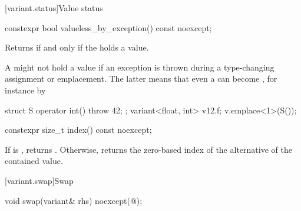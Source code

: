 [variant.status]{Value status}

%
\begin{itemdecl}
constexpr bool valueless_by_exception() const noexcept;
\end{itemdecl}

\begin{itemdescr}
\pnum
\effects
Returns  if and only if the  holds a value.

\pnum
\begin{note}
A  might not hold a value if an exception is thrown during a
type-changing assignment or emplacement. The latter means that even a
 can become , for
instance by
\begin{codeblock}
struct S { operator int() { throw 42; }};
variant<float, int> v{12.f};
v.emplace<1>(S());
\end{codeblock}
\end{note}
\end{itemdescr}

%
\begin{itemdecl}
constexpr size_t index() const noexcept;
\end{itemdecl}

\begin{itemdescr}
\pnum
\effects
If  is , returns .
Otherwise, returns the zero-based index of the alternative of the contained value.
\end{itemdescr}

[variant.swap]{Swap}

%
\begin{itemdecl}
void swap(variant& rhs) noexcept(@\seebelow@);
\end{itemdecl}

